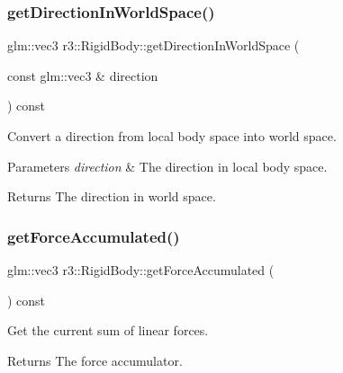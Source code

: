 \subsubsection{\texorpdfstring{get\+Direction\+In\+World\+Space()}{getDirectionInWorldSpace()}}
{\footnotesize\ttfamily glm\+::vec3 r3\+::\+Rigid\+Body\+::get\+Direction\+In\+World\+Space (\begin{DoxyParamCaption}\item[{const glm\+::vec3 \&}]{direction }\end{DoxyParamCaption}) const}



Convert a direction from local body space into world space. 


\begin{DoxyParams}{Parameters}
{\em direction} & The direction in local body space. \\
\hline
\end{DoxyParams}
\begin{DoxyReturn}{Returns}
The direction in world space. 
\end{DoxyReturn}
\mbox{\label{classr3_1_1_rigid_body_ae15bce9cc4aa2db577bdfb61464d26c0}} 
\subsubsection{\texorpdfstring{get\+Force\+Accumulated()}{getForceAccumulated()}}
{\footnotesize\ttfamily glm\+::vec3 r3\+::\+Rigid\+Body\+::get\+Force\+Accumulated (\begin{DoxyParamCaption}{ }\end{DoxyParamCaption}) const}



Get the current sum of linear forces. 

\begin{DoxyReturn}{Returns}
The force accumulator. 
\end{DoxyReturn}
\mbox{\label{classr3_1_1_rigid_body_ae9057a0acbb7dd552a23557ed773b3d5}} 
